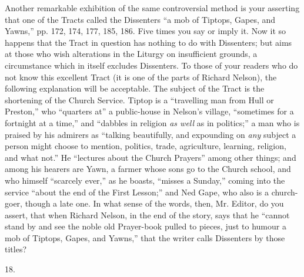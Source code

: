 Another remarkable exhibition of the same
controversial method is your asserting that one of the Tracts called
the Dissenters ``a mob of Tiptops, Gapes, and Yawns,'' pp. 172, 174,
177, 185, 186. Five times you say or imply it. Now it so happens that
the Tract in question has nothing to do with Dissenters; but aims at
those who wish alterations in the Liturgy on insufficient grounds, a
circumstance which in itself excludes Dissenters. To those of your
readers who do not know this excellent Tract (it is one of the parts
of Richard Nelson), the following explanation will be
acceptable. The subject of the Tract is the shortening of the Church
Service. Tiptop is a ``travelling man from Hull or Preston,'' who ``quarters
at'' a public-house in Nelson's village, ``sometimes for a fortnight at
a time,'' and ``dabbles in religion \emph{as well} as in politics;'' a
man who is praised by his admirers as ``talking beautifully, and
expounding on \emph{any} subject a person might choose to mention,
politics, trade, agriculture, learning, religion, and what not.'' He ``lectures
about the Church Prayers'' among other things; and among his hearers
are Yawn, a farmer whose sons go to the Church school, and who himself
``scarcely ever,'' as he boasts, ``misses a Sunday,'' coming into the
service ``about the end of the First Lesson;'' and Ned Gape, who
also is a church-goer, though a late one. In what sense of the words,
then, Mr. Editor, do you assert, that when Richard Nelson, in the end
of the story, says that he ``cannot stand by and see the noble old
Prayer-book pulled to pieces, just to humour a mob of Tiptops, Gapes,
and Yawns,'' that the writer calls Dissenters by those titles?

18.

